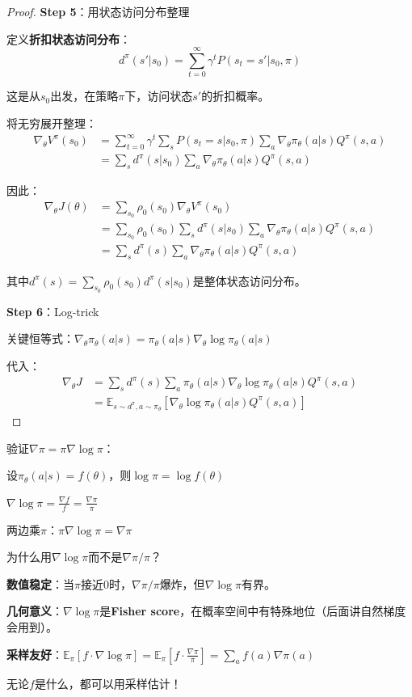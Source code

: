\documentclass[11pt,a4paper]{article}
\theoremstyle{definition}
\begin{document}
\begin{proof}
\textbf{Step 5}：用状态访问分布整理

定义\textbf{折扣状态访问分布}：
\[
d^\pi(s' | s_0) = \sum_{t=0}^\infty \gamma^t P(s_t = s' | s_0, \pi)
\]

这是从$s_0$出发，在策略$\pi$下，访问状态$s'$的折扣概率。

将无穷展开整理：
\begin{align*}
\nabla_\theta V^\pi(s_0) &= \sum_{t=0}^\infty \gamma^t \sum_{s} P(s_t = s | s_0, \pi) \sum_a \nabla_\theta \pi_\theta(a|s) Q^\pi(s,a) \\
&= \sum_s d^\pi(s|s_0) \sum_a \nabla_\theta \pi_\theta(a|s) Q^\pi(s,a)
\end{align*}

因此：
\begin{align*}
\nabla_\theta J(\theta) &= \sum_{s_0} \rho_0(s_0) \nabla_\theta V^\pi(s_0) \\
&= \sum_{s_0} \rho_0(s_0) \sum_s d^\pi(s|s_0) \sum_a \nabla_\theta \pi_\theta(a|s) Q^\pi(s,a) \\
&= \sum_s d^\pi(s) \sum_a \nabla_\theta \pi_\theta(a|s) Q^\pi(s,a)
\end{align*}

其中$d^\pi(s) = \sum_{s_0} \rho_0(s_0) d^\pi(s|s_0)$是整体状态访问分布。

\textbf{Step 6}：Log-trick

关键恒等式：$\nabla_\theta \pi_\theta(a|s) = \pi_\theta(a|s) \nabla_\theta \log \pi_\theta(a|s)$

代入：
\begin{align*}
\nabla_\theta J &= \sum_s d^\pi(s) \sum_a \pi_\theta(a|s) \nabla_\theta \log \pi_\theta(a|s) Q^\pi(s,a) \\
&= \mathbb{E}_{s \sim d^\pi, a \sim \pi_\theta}\left[\nabla_\theta \log \pi_\theta(a|s) Q^\pi(s,a)\right]
\end{align*}
\end{proof}

\begin{calculation}
验证$\nabla \pi = \pi \nabla \log \pi$：

设$\pi_\theta(a|s) = f(\theta)$，则$\log \pi = \log f(\theta)$

$\nabla \log \pi = \frac{\nabla f}{f} = \frac{\nabla \pi}{\pi}$

两边乘$\pi$：$\pi \nabla \log \pi = \nabla \pi$ \quad \checkmark
\end{calculation}

\begin{keypoint}
为什么用$\nabla \log \pi$而不是$\nabla \pi / \pi$？

\textbf{数值稳定}：当$\pi$接近0时，$\nabla \pi / \pi$爆炸，但$\nabla \log \pi$有界。

\textbf{几何意义}：$\nabla \log \pi$是\textbf{Fisher score}，在概率空间中有特殊地位（后面讲自然梯度会用到）。

\textbf{采样友好}：$\mathbb{E}_\pi[f \cdot \nabla \log \pi] = \mathbb{E}_\pi[f \cdot \frac{\nabla \pi}{\pi}] = \sum_a f(a) \nabla \pi(a)$

无论$f$是什么，都可以用采样估计！
\end{keypoint}
\end{document}
